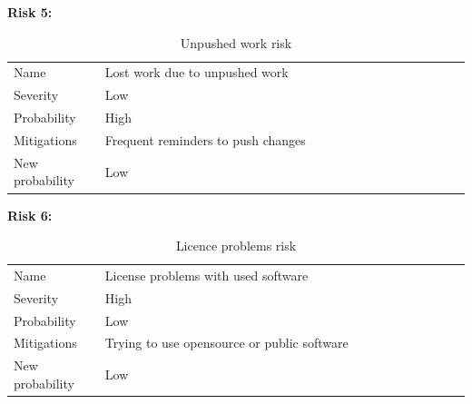 \begin{table}
  \centering
  \textbf{Risk 5:}
  \begin{tabular}{p{0.2\linewidth}p{0.8\linewidth}}
    Name            & Lost work due to unpushed work           \\
    Severity        & Low                                 \\
    Probability     & High                                   \\
    Mitigations     & Frequent reminders to push changes  \\
    New probability & Low                                   
  \end{tabular}
  \caption{Unpushed work risk}
\end{table}

\begin{table}
  \centering
  \textbf{Risk 6:}
  \begin{tabular}{p{0.2\linewidth}p{0.8\linewidth}}
    Name            & License problems with used software           \\
    Severity        & High                                 \\
    Probability     & Low                                   \\
    Mitigations     & Trying to use opensource or public software  \\
    New probability & Low                                   
  \end{tabular}
  \caption{Licence problems risk}
\end{table}
